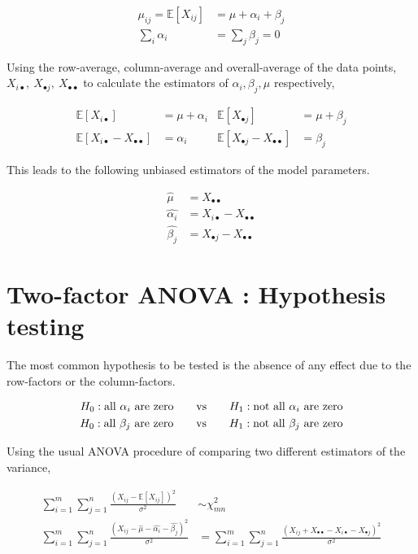 \begin{align}
	\mu_{ij} = \mathbb{E}[X_{ij}] &= \mu + \alpha_i + \beta_j \\
	\sum_{i} \alpha_i &= \sum_{j} \beta_j = 0 
\end{align}

Using the row-average, column-average and overall-average of the data points, $ X_{i\bullet},\ X_{\bullet j},\ X_{\bullet \bullet} $ to calculate the estimators of $ \alpha_i, \beta_j, \mu $ respectively,

\begin{align}
	\mathbb{E}[X_{i\bullet}] &= \mu + \alpha_i & \mathbb{E}[X_{\bullet j}] &= \mu + \beta_j \\
	\mathbb{E}[X_{i\bullet} - X_{\bullet \bullet}] &= \alpha_i & \mathbb{E}[X_{\bullet j} - X_{\bullet \bullet}] &=  \beta_j 
\end{align}

This leads to the following unbiased estimators of the model parameters.

\begin{align}
	\widehat{\mu} &= X_{\bullet \bullet} \nonumber \\
	\widehat{\alpha_i} &= X_{i\bullet} - X_{\bullet \bullet} \nonumber \\
	\widehat{\beta_j} &= X_{\bullet j} - X_{\bullet \bullet}
\end{align}

\section{Two-factor ANOVA : Hypothesis testing} 

The most common hypothesis to be tested is the absence of any effect due to the row-factors or the column-factors.

\begin{align}
	H_0 : \text{all $ \alpha_i $ are zero} \qquad \text{vs} \qquad H_1 : \text{not all $ \alpha_i $ are zero} \nonumber \\
	H_0 : \text{all $ \beta_j $ are zero} \qquad \text{vs} \qquad H_1 : \text{not all $ \beta_j $ are zero} \nonumber
\end{align}

Using the usual ANOVA procedure of comparing two different estimators of the variance,

\begin{align}
	\sum\limits_{i = 1}^{m} \sum\limits_{j = 1}^{n} \frac{(X_{ij} - \mathbb{E}[X_{ij}])^2}{\sigma^2} &\sim \chi^2_{mn} \nonumber \\
	\sum\limits_{i = 1}^{m} \sum\limits_{j = 1}^{n} \frac{(X_{ij} - \widehat{\mu} - \widehat{\alpha_i} - \widehat{\beta_j})^2}{\sigma^2} &= \sum\limits_{i = 1}^{m} \sum\limits_{j = 1}^{n} \frac{(X_{ij} + X_{\bullet \bullet} - X_{i \bullet} - X_{\bullet j})^2}{\sigma^2}
\end{align}

